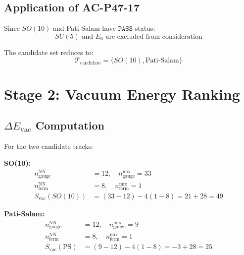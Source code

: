 \documentclass[11pt,a4paper]{article}
\begin{document}
\subsection{Application of AC-P47-17}
\label{subsec:ac-p47-17-app}

Since $SO(10)$ and Pati-Salam have $\texttt{PASS}$ status:
\begin{equation}
\label{eq:ac-p47-17-app}
\boxed{SU(5) \text{ and } E_6 \text{ are excluded from consideration}}
\end{equation}

The candidate set reduces to:
\begin{equation}
\label{eq:candidate-set}
\mathcal{T}_{\text{candidate}} = \{SO(10), \text{Pati-Salam}\}
\end{equation}

\section{Stage 2: Vacuum Energy Ranking}
\label{sec:stage2-impl}

\subsection{$\Delta E_{\text{vac}}$ Computation}
\label{subsec:evac-comp}

For the two candidate tracks:

\textbf{SO(10):}
\begin{align}
\label{eq:evac-so10-gauge}
n_{\text{gauge}}^{\text{NN}} &= 12, \quad n_{\text{gauge}}^{\text{mix}} = 33 \\
\label{eq:evac-so10-ferm}
n_{\text{ferm}}^{\text{NN}} &= 8, \quad n_{\text{ferm}}^{\text{mix}} = 1 \\
\label{eq:evac-so10-score}
S_{\text{vac}}(SO(10)) &= (33 - 12) - 4(1 - 8) = 21 + 28 = 49
\end{align}

\textbf{Pati-Salam:}
\begin{align}
\label{eq:evac-ps-gauge}
n_{\text{gauge}}^{\text{NN}} &= 12, \quad n_{\text{gauge}}^{\text{mix}} = 9 \\
\label{eq:evac-ps-ferm}
n_{\text{ferm}}^{\text{NN}} &= 8, \quad n_{\text{ferm}}^{\text{mix}} = 1 \\
\label{eq:evac-ps-score}
S_{\text{vac}}(\text{PS}) &= (9 - 12) - 4(1 - 8) = -3 + 28 = 25
\end{align}
\end{document}
